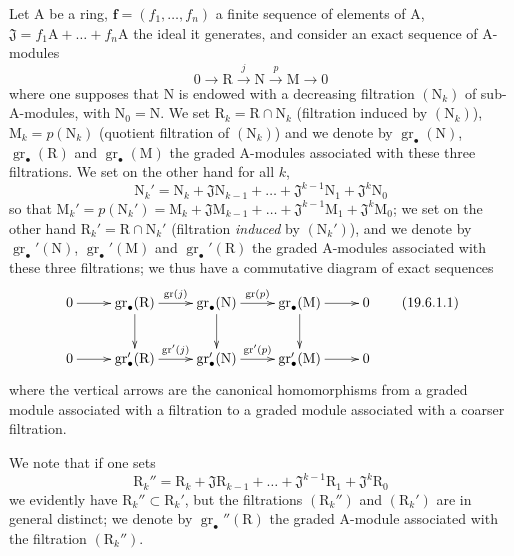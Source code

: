 \begin{env}[19.6.1]
\label{IV.19.6.1}
Let $\mathrm{A}$ be a ring, $\mathbf{f}=(f_1,\ldots,f_n)$ a finite sequence of elements of $\mathrm{A}$, $\mathfrak{J}=f_1\mathrm{A}+\ldots+f_n\mathrm{A}$ the ideal it generates, and consider an exact sequence of $\mathrm{A}$-modules
\[
  0\to\mathrm{R}\xrightarrow{j}\mathrm{N}\xrightarrow{p}\mathrm{M}\to 0
\]
where one supposes that $\mathrm{N}$ is endowed with a decreasing filtration $(\mathrm{N}_k)$ of sub-$\mathrm{A}$-modules, with $\mathrm{N}_0=\mathrm{N}$. We set $\mathrm{R}_k=\mathrm{R}\cap\mathrm{N}_k$ (filtration induced by $(\mathrm{N}_k)$), $\mathrm{M}_k=p(\mathrm{N}_k)$ (quotient filtration of $(\mathrm{N}_k)$) and we denote by $\operatorname{gr}_\bullet(\mathrm{N})$, $\operatorname{gr}_\bullet(\mathrm{R})$ and $\operatorname{gr}_\bullet(\mathrm{M})$ the graded $\mathrm{A}$-modules associated with these three filtrations. We set on the other hand for all $k$,
\[
  \mathrm{N}_k'=\mathrm{N}_k+\mathfrak{J}\mathrm{N}_{k-1}+\ldots+\mathfrak{J}^{k-1}\mathrm{N}_1+\mathfrak{J}^k\mathrm{N}_0
\]
so that $\mathrm{M}_k'=p(\mathrm{N}_k')=\mathrm{M}_k+\mathfrak{J}\mathrm{M}_{k-1}+\ldots+\mathfrak{J}^{k-1}\mathrm{M}_1+\mathfrak{J}^k\mathrm{M}_0$; we set on the other hand $\mathrm{R}_k'=\mathrm{R}\cap\mathrm{N}_k'$ (filtration \emph{induced} by $(\mathrm{N}_k')$), and we denote by $\operatorname{gr}_\bullet'(\mathrm{N})$, $\operatorname{gr}_\bullet'(\mathrm{M})$ and $\operatorname{gr}_\bullet'(\mathrm{R})$ the graded $\mathrm{A}$-modules associated with these three filtrations; we thus have a commutative diagram of exact sequences
\[
\xymatrix{
  0 \ar[r] & \operatorname{gr}_\bullet(\mathrm{R}) \ar[r]^-{\operatorname{gr}(j)} \ar[d] & \operatorname{gr}_\bullet(\mathrm{N}) \ar[r]^-{\operatorname{gr}(p)} \ar[d] & \operatorname{gr}_\bullet(\mathrm{M}) \ar[r] \ar[d] & 0 \\
  0 \ar[r] & \operatorname{gr}_\bullet'(\mathrm{R}) \ar[r]^-{\operatorname{gr}'(j)} & \operatorname{gr}_\bullet'(\mathrm{N}) \ar[r]^-{\operatorname{gr}'(p)} & \operatorname{gr}_\bullet'(\mathrm{M}) \ar[r] & 0
}
\tag{19.6.1.1}
\]
where the vertical arrows are the canonical homomorphisms from a graded module associated with a filtration to a graded module associated with a coarser filtration.

We note that if one sets
\[
  \mathrm{R}_k''=\mathrm{R}_k+\mathfrak{J}\mathrm{R}_{k-1}+\ldots+\mathfrak{J}^{k-1}\mathrm{R}_1+\mathfrak{J}^k\mathrm{R}_0
\]
we evidently have $\mathrm{R}_k''\subset\mathrm{R}_k'$, but the filtrations $(\mathrm{R}_k'')$ and $(\mathrm{R}_k')$ are in general distinct; we denote by $\operatorname{gr}_\bullet''(\mathrm{R})$ the graded $\mathrm{A}$-module associated with the filtration $(\mathrm{R}_k'')$.
\end{env}

